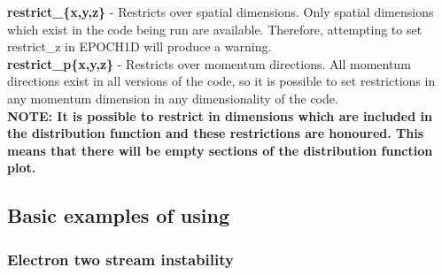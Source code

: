 \documentclass[12pt,a4paper]{article}
\newcommand{\emphtext}{\color{warwickdark} \fontfamily{phv}\selectfont\Large\bf}
\newcommand{\EPOCH}{{\color{warwickdark}\fontfamily{phv}\selectfont{EPOCH}}}
\begin{document}
{\emphtext restrict\_\{x,y,z\}} - Restricts over spatial dimensions. Only
spatial dimensions which exist in the code being run are available. Therefore,
attempting to set restrict\_z in EPOCH1D will produce a warning.\\

{\emphtext restrict\_p\{x,y,z\}} - Restricts over momentum directions. All
momentum directions exist in all versions of the code, so it is possible to set
restrictions in any momentum dimension in any dimensionality of the code.\\

{\emphtext NOTE: It is possible to restrict in dimensions which are included in
the distribution function and these restrictions are honoured. This means that
there will be empty sections of the distribution function plot.}

\subsection{Basic examples of using {\EPOCH}}

\subsubsection{Electron two stream instability}
\end{document}
